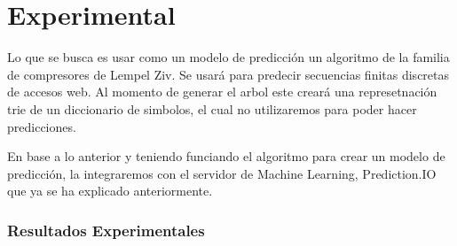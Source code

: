 \chapter[Experimental]{Experimental}
\label{ch:tema}


Lo que se busca es usar como un modelo de predicción un algoritmo de la familia de compresores de Lempel Ziv. Se usará para predecir secuencias finitas discretas de accesos web. Al momento de generar el arbol este creará una represetnación trie de un diccionario de simbolos, el cual no utilizaremos para poder hacer predicciones.

En base a lo anterior y teniendo funciando el algoritmo para crear un modelo de predicción, la integraremos con el servidor de Machine Learning, Prediction.IO que ya se ha explicado anteriormente.





\subsection{Resultados Experimentales}






 
 
 




 

